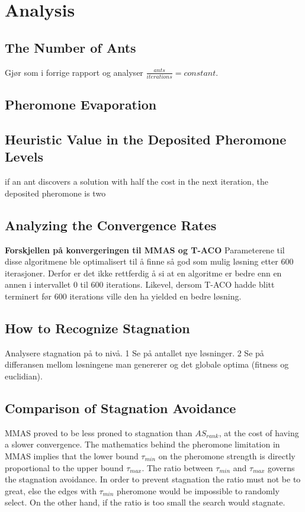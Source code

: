 \graphicspath{{chapters/chapter6/}}
\chapter{Analysis}

\section{The Number of Ants}
Gjør som i forrige rapport og analyser $\frac{ants}{iterations} = constant$.

%


\section{Pheromone Evaporation}
%


\section{Heuristic Value in the Deposited Pheromone Levels}
if an ant discovers a solution with half the cost in the next iteration, the deposited pheromone is two 

% 


\section{Analyzing the Convergence Rates}
\textbf{Forskjellen på konvergeringen til MMAS og T-ACO} Parameterene til disse algoritmene ble optimalisert til å finne så god som mulig løsning etter 600 iterasjoner. Derfor er det ikke rettferdig å si at en algoritme er bedre enn en annen i intervallet 0 til 600 iterations. Likevel, dersom T-ACO hadde blitt terminert før 600 iterations ville den ha yielded en bedre løsning.

%


\section{How to Recognize Stagnation}
Analysere stagnation på to nivå. 1 Se på antallet nye løsninger. 2 Se på differansen mellom løsningene man genererer og det globale optima (fitness og euclidian).

%


\section{Comparison of Stagnation Avoidance}
MMAS proved to be less proned to stagnation than $AS_{rank}$, at the cost of having a slower convergence. The mathematics behind the pheromone limitation in MMAS implies that the lower bound $\tau_{min}$ on the pheromone strength is directly proportional to the upper bound $\tau_{max}$. The ratio between $\tau_{min}$ and $\tau_{max}$ governs the stagnation avoidance. In order to prevent stagnation the ratio must not be to great, else the edges with $\tau_{min}$ pheromone would be impossible to randomly select. On the other hand, if the ratio is too small the search would stagnate. 

